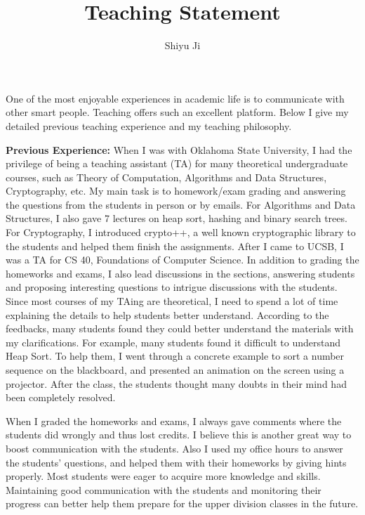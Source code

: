 \documentclass[12pt]{article}
\begin{document}
\title{Teaching Statement}
\author{Shiyu Ji}\date{}
\maketitle

One of the most enjoyable experiences in academic life is to communicate with other smart people. Teaching offers such an excellent platform. Below I give my detailed previous teaching experience and my teaching philosophy.

{\bf Previous Experience:} When I was with Oklahoma State University, I had the privilege of being a teaching assistant (TA) for many theoretical undergraduate courses, such as Theory of Computation, Algorithms and Data Structures, Cryptography, etc. My main task is to homework/exam grading and answering the questions from the students in person or by emails. For Algorithms and Data Structures, I also gave 7 lectures on heap sort, hashing and binary search trees. For Cryptography, I introduced crypto++, a well known cryptographic library to the students and helped them finish the assignments. 
After I came to UCSB, I was a TA for CS 40, Foundations of Computer Science. In addition to grading the homeworks and exams, I also lead discussions in the sections, answering students and proposing interesting questions to intrigue discussions with the students. Since most courses of my TAing are theoretical, I need to spend a lot of time explaining the details to help students better understand. According to the feedbacks, many students found they could better understand the materials with my clarifications. For example, many students found it difficult to understand Heap Sort. To help them, I went through a concrete example to sort a number sequence on the blackboard, and presented an animation on the screen using a projector. After the class, the students thought many doubts in their mind had been completely resolved. 

When I graded the homeworks and exams, I always gave comments where the students did wrongly and thus lost credits. I believe this is another great way to boost communication with the students. Also I used my office hours to answer the students' questions, and helped them with their homeworks by giving hints properly. Most students were eager to acquire more knowledge and skills. Maintaining good communication with the students and monitoring their progress can better help them prepare for the upper division classes in the future. 
\end{document}
